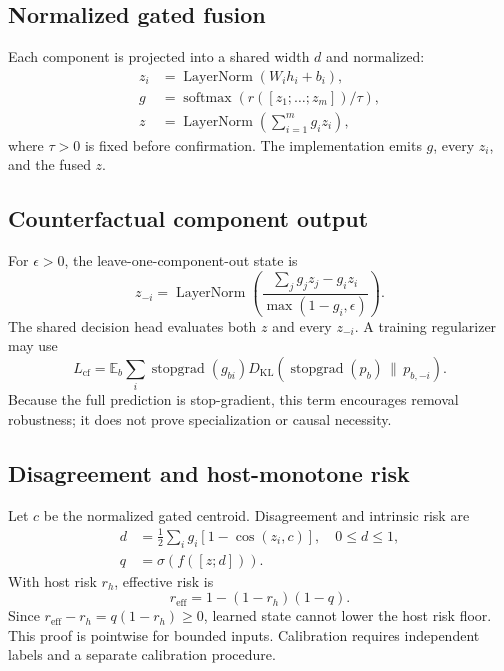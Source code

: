 \documentclass[10pt]{article}
\newcommand{\E}{\mathbb{E}}
\newcommand{\softmax}{\operatorname{softmax}}
\newcommand{\stopgrad}{\operatorname{stopgrad}}
\begin{document}
\subsection{Normalized gated fusion}
Each component is projected into a shared width $d$ and normalized:
\begin{align}
z_i &= \operatorname{LayerNorm}(W_i h_i+b_i),\\
g &= \softmax\left(r([z_1;\ldots;z_m])/\tau\right),\\
z &= \operatorname{LayerNorm}\left(\sum_{i=1}^{m} g_i z_i\right),
\end{align}
where $\tau>0$ is fixed before confirmation. The implementation emits $g$, every $z_i$,
and the fused $z$.

\subsection{Counterfactual component output}
For $\epsilon>0$, the leave-one-component-out state is
\begin{equation}
z_{-i}=\operatorname{LayerNorm}\left(
\frac{\sum_j g_jz_j-g_iz_i}{\max(1-g_i,\epsilon)}\right).
\end{equation}
The shared decision head evaluates both $z$ and every $z_{-i}$. A training regularizer may
use
\begin{equation}
L_{\mathrm{cf}}=\E_b\sum_i\stopgrad(g_{bi})
D_{\mathrm{KL}}\left(\stopgrad(p_b)\,\|\,p_{b,-i}\right).
\end{equation}
Because the full prediction is stop-gradient, this term encourages removal robustness; it
does not prove specialization or causal necessity.

\subsection{Disagreement and host-monotone risk}
Let $c$ be the normalized gated centroid. Disagreement and intrinsic risk are
\begin{align}
d &= \frac12\sum_i g_i\left[1-\cos(z_i,c)\right], \quad 0\le d\le1,\\
q &= \sigma(f([z;d])).
\end{align}
With host risk $r_h$, effective risk is
\begin{equation}
r_{\mathrm{eff}}=1-(1-r_h)(1-q).
\end{equation}
Since $r_{\mathrm{eff}}-r_h=q(1-r_h)\ge0$, learned state cannot lower the host risk floor.
This proof is pointwise for bounded inputs. Calibration requires independent labels and a
separate calibration procedure.
\end{document}
